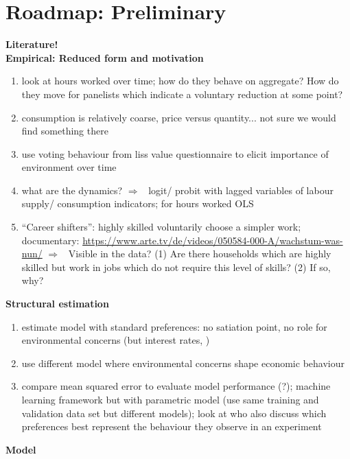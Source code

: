 \documentclass[12pt]{article}
\newcommand{\ar}{$\Rightarrow$ \ }
\begin{document}
\section{Roadmap: Preliminary}
\textbf{Literature!}\\ 
\textbf{Empirical: Reduced form and motivation}
\begin{enumerate}
\item look at hours worked over time; how do they behave on aggregate? How do they move for panelists which indicate a voluntary reduction at some point?
\item consumption is relatively coarse, price versus quantity... not sure we would find something there
\item use voting behaviour from liss value questionnaire to elicit importance of environment over time
\item what are the dynamics? \ar logit/ probit with lagged variables of labour supply/ consumption indicators; for hours worked OLS
\item {``Career shifters'': highly skilled voluntarily choose a simpler work; documentary: \url{https://www.arte.tv/de/videos/050584-000-A/wachstum-was-nun/} }\ar Visible in the data? (1) Are there households which are highly skilled but work in jobs which do not require this level of skills? (2) If so, why?
\end{enumerate}
\textbf{Structural estimation}
\begin{enumerate}
	\item estimate model with standard preferences: no satiation point, no role for environmental concerns (but interest rates, )
	\item use different model  where environmental concerns shape economic behaviour
	\item compare mean squared error to evaluate model performance (?); machine learning framework but with parametric model (use same training and validation data set but different models); look at \cite{Bartling2015DoResponsibility} who also discuss which preferences best represent the behaviour they observe in an experiment
\end{enumerate}
\textbf{Model}
\end{document}
